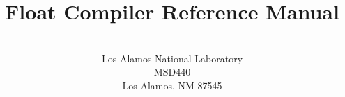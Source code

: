 \documentclass[10pt]{article}
\begin{document}
\title{Float Compiler Reference Manual }
       
\author{\\
Los Alamos National Laboratory \\ MSD440 \\
Los Alamos, NM 87545\\ \\
}

\maketitle

\thispagestyle{empty}

\begin{abstract}
\end{abstract}






%
%

%
%
\end{document}
